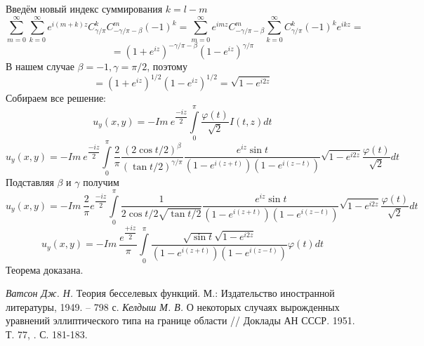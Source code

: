 \documentclass[12pt, a4paper]{article}
\begin{document}
	Введём новый индекс суммирования $k = l -m$
	\begin{equation*}
		\sum\limits_{m=0}^{\infty} \sum\limits_{k=0}^{\infty} e^{i(m+k)z} C^{k}_{\gamma/\pi} C^{m}_{-\gamma/\pi - \beta} (-1)^{k} = \sum\limits_{m=0}^{\infty} e^{imz} C^{m}_{-\gamma/\pi - \beta} \sum\limits_{k=0}^{\infty}  C^{k}_{\gamma/\pi} (-1)^k e^{ikz} = 
	\end{equation*}
	\begin{equation*}
		= (1 + e^{iz})^{-\gamma/\pi - \beta} (1- e^{iz})^{\gamma/\pi} 
	\end{equation*}
	В нашем случае $\beta = -1, \gamma = \pi/2$, поэтому
	\begin{equation*}
		= (1 + e^{iz})^{1/2} (1- e^{iz})^{1/2} =\sqrt{1 - e^{i2z}} 
	\end{equation*}
	Собираем все решение:
	\begin{equation*}
		u_y(x,y) = - Im\ e^{\dfrac{-iz}{2}} \int\limits_0^\pi \dfrac{\varphi(t)}{\sqrt2} I(t,z) dt 
	\end{equation*}
	\begin{equation*}
		u_y(x,y) = - Im\ e^{\dfrac{-iz}{2}} \int\limits_0^\pi \dfrac{2}{\pi}\dfrac{(2\cos{t/2})^\beta}{(\tan{t/2})^{\gamma/\pi}}  \dfrac{e^{iz} \sin{t}}{\left(1 - e^{i(z+t)} \right) \left(1 - e^{i(z-t)}\right)} \sqrt{1 - e^{i2z}} \dfrac{\varphi(t)}{\sqrt2} dt
	\end{equation*}
	Подставляя $\beta$ и $\gamma$ получим
	\begin{equation*}
		u_y(x,y) = - Im\  \dfrac{2}{\pi} e^{\dfrac{-iz}{2}} \int\limits_0^\pi \dfrac{1}{2\cos{t/2} \sqrt{\tan{t/2}}}  \dfrac{e^{iz} \sin{t}}{\left(1 - e^{i(z+t)} \right) \left(1 - e^{i(z-t)}\right)} \sqrt{1 - e^{i2z}} \dfrac{\varphi(t)}{\sqrt2} dt
	\end{equation*}
	\begin{equation*}
		u_y(x,y) = - Im\  \dfrac{e^{\dfrac{+iz}{2}}}{\pi}  \int\limits_0^\pi  \dfrac{\sqrt{\sin{t}} \sqrt{1 - e^{i2z}}}{\left(1 - e^{i(z+t)} \right) \left(1 - e^{i(z-t)}\right)}  \varphi(t) dt
	\end{equation*}
	Теорема доказана.


\newpage
\begin{thebibliography}{30}

{\it Ватсон Дж. Н.} Теория бесселевых функций. М.: Издательство иностранной литературы, 1949. -- 798 с.
{\it Келдыш М. В.} О некоторых случаях вырожденных уравнений эллиптического типа на границе области // Доклады АН СССР. 1951. Т. 77, . С. 181-183.

\end{thebibliography}
\end{document}
